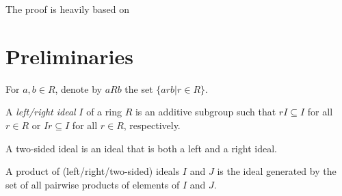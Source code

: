 %

The proof is heavily based on \cite{bresar2024wedderburnartintheorem}

\section{Preliminaries}
  \begin{definition}
      For $a, b \in R$, denote by $aRb$ the set $\{arb| r \in R\}$.
  \end{definition}

  \begin{definition}
    A \textit{left/right ideal} $I$ of a ring $R$ is an additive subgroup such that $rI \subseteq I$ for all $r \in R$ or $Ir \subseteq I$ for all $r \in R$, respectively.
  \end{definition}

  \begin{definition}
    A two-sided ideal is an ideal that is both a left and a right ideal.
  \end{definition}

  \begin{definition}
    A product of (left/right/two-sided) ideals $I$ and $J$ is the ideal generated by the set of all pairwise products of elements of $I$ and $J$.
  \end{definition}


